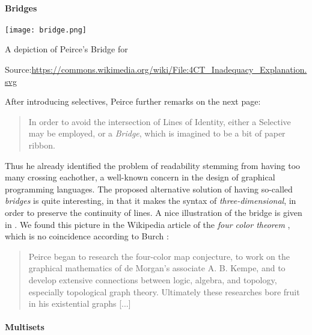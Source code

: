 \begin{scope}
\begin{scope}
\paragraph{Bridges} 

\begin{marginfigure}
  \texttt{[image: bridge.png]}
  \caption{A depiction of Peirce's Bridge for }
  \footnotesize Source:\hspace{3pt}\url{https://commons.wikimedia.org/wiki/File:4CT_Inadequacy_Explanation.svg}
\end{marginfigure}

After introducing selectives, Peirce further remarks on the next page:
\begin{quote}
  In order to avoid the intersection of Lines of Identity, either a Selective
may be employed, or a \emph{Bridge}, which is imagined to be a bit of paper
ribbon.
\end{quote}
Thus he already identified the problem of readability stemming from having too
many  crossing eachother, a well-known concern in the design of graphical
programming languages. The proposed
alternative solution of having so-called \emph{bridges} is quite interesting, in
that it makes the syntax of  \emph{three-dimensional}, in order to preserve
the continuity of lines. A nice illustration of the bridge is given in
. We found this picture in the Wikipedia article of the
\emph{four color theorem} \cite{noauthor_four_2023}, which is no coincidence
according to Burch \cite{sep-peirce}:
\begin{quote}
  Peirce began to research the four-color map conjecture, to work on the
graphical mathematics of de Morgan's associate A. B. Kempe, and to develop
extensive connections between logic, algebra, and topology, especially
topological graph theory. Ultimately these researches bore fruit in his
existential graphs [...]
\end{quote}

\paragraph{Multisets}


\end{scope}
\end{scope}
